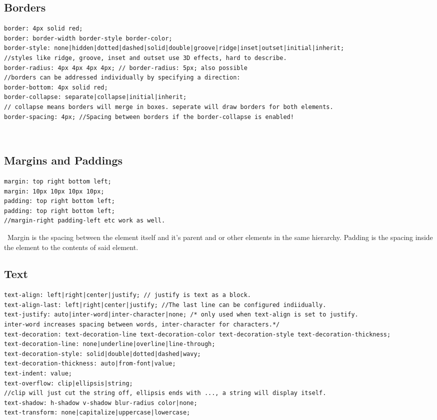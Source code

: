 \documentclass[main.tex,fontsize=6pt,paper=a4,paper=landscape,DIV=calc,]{scrartcl}
\begin{document}
\begin{multicols*}{4}
\subsection{Borders}

\begin{lstlisting}
border: 4px solid red;
border: border-width border-style border-color;
border-style: none|hidden|dotted|dashed|solid|double|groove|ridge|inset|outset|initial|inherit;
//styles like ridge, groove, inset and outset use 3D effects, hard to describe.
border-radius: 4px 4px 4px 4px; // border-radius: 5px; also possible
//borders can be addressed individually by specifying a direction:
border-bottom: 4px solid red;
border-collapse: separate|collapse|initial|inherit;
// collapse means borders will merge in boxes. seperate will draw borders for both elements.
border-spacing: 4px; //Spacing between borders if the border-collapse is enabled!
\end{lstlisting}
\, \newline


\subsection{Margins and Paddings}
\begin{lstlisting}
margin: top right bottom left;
margin: 10px 10px 10px 10px;
padding: top right bottom left;
padding: top right bottom left;
//margin-right padding-left etc work as well.
\end{lstlisting}
\, \newline
Margin is the spacing between the element itself and it's parent and or other elements in the same hierarchy.\newline
Padding is the spacing inside the element to the contents of said element.

\subsection{Text}

\begin{lstlisting}
text-align: left|right|center|justify; // justify is text as a block.
text-align-last: left|right|center|justify; //The last line can be configured indiidually.
text-justify: auto|inter-word|inter-character|none; /* only used when text-align is set to justify.
inter-word increases spacing between words, inter-character for characters.*/
text-decoration: text-decoration-line text-decoration-color text-decoration-style text-decoration-thickness;
text-decoration-line: none|underline|overline|line-through;
text-decoration-style: solid|double|dotted|dashed|wavy;
text-decoration-thickness: auto|from-font|value;
text-indent: value;
text-overflow: clip|ellipsis|string; 
//clip will just cut the string off, ellipsis ends with ..., a string will display itself.
text-shadow: h-shadow v-shadow blur-radius color|none;
text-transform: none|capitalize|uppercase|lowercase;
\end{lstlisting}
\, \newline


\end{multicols*}
\end{document}
